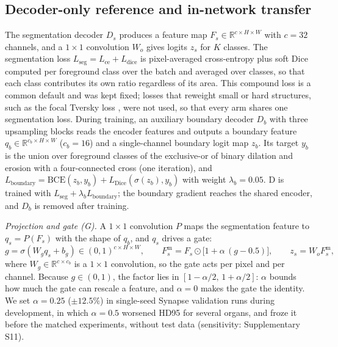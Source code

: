 \documentclass[fleqn,10pt,lineno]{wlpeerj}
\begin{document}
\subsection*{Decoder-only reference and in-network transfer}
The segmentation decoder $D_s$ produces a feature map $F_s\in\mathbb{R}^{c\times H\times W}$ with $c=32$ channels, and a $1\times1$ convolution $W_o$ gives logits $z_s$ for $K$ classes. The segmentation loss $L_{\mathrm{seg}}=L_{\mathrm{ce}}+L_{\mathrm{dice}}$ is pixel-averaged cross-entropy plus soft Dice computed per foreground class over the batch and averaged over classes, so that each class contributes its own ratio regardless of its area. This compound loss is a common default and was kept fixed; losses that reweight small or hard structures, such as the focal Tversky loss \citep{Abraham2019Focal}, were not used, so that every arm shares one segmentation loss. During training, an auxiliary boundary decoder $D_b$ with three upsampling blocks reads the encoder features and outputs a boundary feature $q_b\in\mathbb{R}^{c_b\times H\times W}$ ($c_b=16$) and a single-channel boundary logit map $z_b$. Its target $y_b$ is the union over foreground classes of the exclusive-or of binary dilation and erosion with a four-connected cross (one iteration), and $L_{\mathrm{boundary}}=\mathrm{BCE}(z_b,y_b)+L_{\mathrm{Dice}}(\sigma(z_b),y_b)$ with weight $\lambda_b=0.05$. D is trained with $L_{\mathrm{seg}}+\lambda_bL_{\mathrm{boundary}}$; the boundary gradient reaches the shared encoder, and $D_b$ is removed after training.

\emph{Projection and gate (G).} A $1\times1$ convolution $P$ maps the segmentation feature to $q_s=P(F_s)$ with the shape of $q_b$, and $q_s$ drives a gate:
\begin{equation}
g=\sigma\!\left(W_g q_s+b_g\right)\in(0,1)^{c\times H\times W},\qquad
F_s^{\mathrm{m}}=F_s\odot\bigl[1+\alpha\,(g-0.5)\bigr],\qquad z_s=W_oF_s^{\mathrm{m}},
\label{eq:gate}
\end{equation}
where $W_g\in\mathbb{R}^{c\times c_b}$ is a $1\times1$ convolution, so the gate acts per pixel and per channel. Because $g\in(0,1)$, the factor lies in $[1-\alpha/2,\,1+\alpha/2]$: $\alpha$ bounds how much the gate can rescale a feature, and $\alpha=0$ makes the gate the identity. We set $\alpha=0.25$ ($\pm12.5\%$) in single-seed Synapse validation runs during development, in which $\alpha=0.5$ worsened HD95 for several organs, and froze it before the matched experiments, without test data (sensitivity: Supplementary S11).
\end{document}
